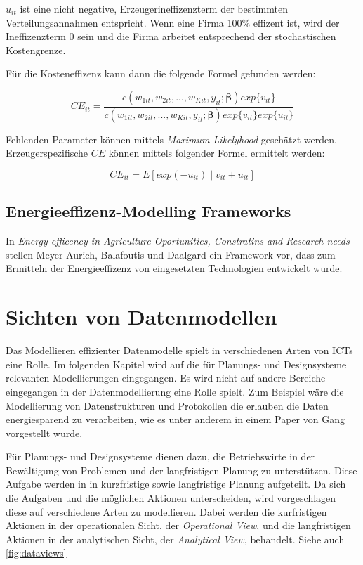 $u_{it}$ ist eine nicht negative, Erzeugerineffizenzterm der bestimmten Verteilungsannahmen entspricht. Wenn eine Firma 100\% effizent ist, wird der Ineffizenzterm 0 sein und die Firma arbeitet entsprechend der stochastischen Kostengrenze.

Für die Kosteneffizenz kann dann die folgende Formel gefunden werden:

\begin{equation}
	CE_{it} = \frac{c(w_{1it},w_{2it},...,w_{Kit},y_{it};\boldsymbol{\beta})exp\{v_{it}\}}{c(w_{1it},w_{2it},...,w_{Kit},y_{it};\boldsymbol{\beta})exp\{v_{it}\}exp\{u_{it}\}}
\end{equation}

Fehlenden Parameter können mittels \textit{Maximum Likelyhood} geschätzt werden. Erzeugerspezifische $CE$ können mittels folgender Formel ermittelt werden:\cite{conf:Jian2013}

\begin{equation}
	CE_{it}=E[exp(-u_{it}) \mid v_{it}+u_{it}]
\end{equation}

\subsection{Energieeffizenz-Modelling Frameworks}
In \textit{Energy efficency in Agriculture-Oportunities, Constratins and Research needs}\cite{jour:Meyer-Aurich2013} stellen Meyer-Aurich, Balafoutis und Daalgard ein Framework vor, dass zum Ermitteln der Energieeffizenz von eingesetzten Technologien entwickelt wurde.

\section{Sichten von Datenmodellen}
Das Modellieren effizienter Datenmodelle spielt in verschiedenen Arten von ICTs eine Rolle. Im folgenden Kapitel wird auf die für Planungs- und Designsysteme relevanten Modellierungen eingegangen. Es wird nicht auf andere Bereiche eingegangen in der Datenmodellierung eine Rolle spielt. Zum Beispiel wäre die Modellierung von Datenstrukturen und Protokollen die erlauben die Daten energiesparend zu verarbeiten, wie es unter anderem in einem Paper von Gang\cite{jour:Lu2007} vorgestellt wurde.

Für Planungs- und Designsysteme dienen dazu, die Betriebswirte in der Bewältigung von Problemen und der langfristigen Planung zu unterstützen. Diese Aufgabe werden in \cite{jour:Schulze2007} in kurzfristige sowie langfristige Planung aufgeteilt. Da sich die Aufgaben und die möglichen Aktionen unterscheiden, wird vorgeschlagen diese auf verschiedene Arten zu modellieren. Dabei werden die kurfristigen Aktionen in der operationalen Sicht, der \textit{Operational View}, und die langfristigen Aktionen in der analytischen Sicht, der \textit{Analytical View}, behandelt. Siehe auch \ref{fig:dataviews}

